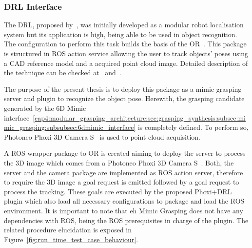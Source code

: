 \subsubsection{\acl{DRL} Interface}
\label{cap4:modular_grasping_architecture:sec:grasping_synthesis:subsec:mimic_grasping:subsubsec:drl_interface}

The \ac{DRL}, proposed by~\cite{COSTA2016113}, was initially developed as a modular robot localisation system but its application is high, being able to be used in object recognition. The configuration to perform this task builds the basis of the \ac{OR}~\cite{or}. This package is structured in \ac{ROS} action service allowing the user to track objects' poses using a CAD reference model and a acquired point cloud image. Detailed description of the technique can be checked at~\cite{COSTA2016113} and~\cite{or}.

The purpose of the present thesis is to deploy this package as a mimic grasping server and plugin to recognize the object pose. Herewith, the grasping candidate generated by the 6D Mimic interface~\ref{cap4:modular_grasping_architecture:sec:grasping_synthesis:subsec:mimic_grasping:subsubsec:6dmimic_interface} is completely defined. To perform so, Photoneo Phoxi 3D Camera S~\cite{photoneo} is used to point cloud acquisition.


A \ac{ROS} wrapper package to \ac{OR} is created aiming to deploy the server to process the 3D image which comes from a Photoneo Phoxi 3D Camera S~\cite{photoneo}. Both, the server and the camera package are implemented as \ac{ROS} action server, therefore to require the 3D image a goal request is emitted followed by a goal request to process the tracking. These goals are executed by the proposed Phoxi+\ac{DRL} plugin which also load all necessary configurations to package and load the \ac{ROS} environment. It is important to note that eh Mimic Grasping does not have any dependencies with ROS, being the \ac{ROS} prerequisites in charge of the plugin. The related procedure elucidation is exposed in Figure~\ref{fig:run_time_test_case_behaviour}.


